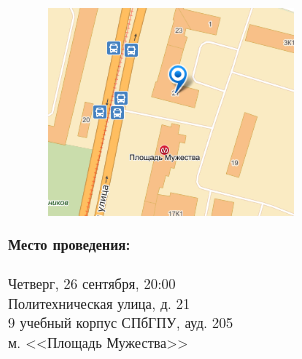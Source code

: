 \documentclass[12pt]{article}
\begin{document}
\begin{minipage}{0.5\textwidth}
\begin{figure}[H]
\includegraphics[width=6.5cm]{map.png} 
\end{figure}
\end{minipage} \hfill
\begin{minipage}{0.45\textwidth}
\textbf{Место проведения:}\\
\\
Четверг, 26 сентября, 20:00\\
Политехническая улица, д. 21\\
9 учебный корпус СПбГПУ, ауд. 205\\
м. <<Площадь Мужества>>\\
\end{minipage}
\end{document}
